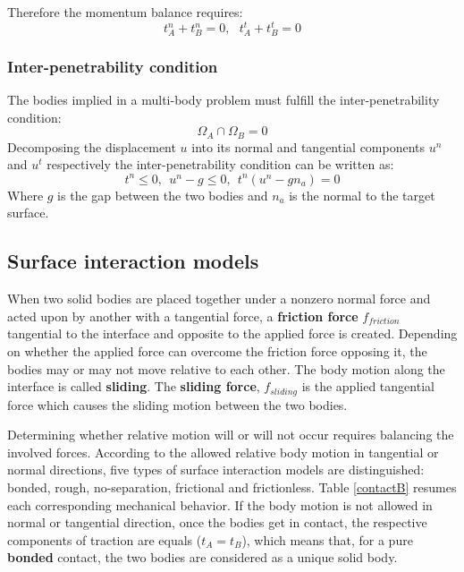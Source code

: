 Therefore the momentum balance requires:
\begin{equation} 
t_A^n + t_B^n = 0, \ \ \ t_A^t + t_B^t = 0
\end{equation} 

 \subsubsection*{Inter-penetrability condition}
The bodies implied in a multi-body problem must fulfill the inter-penetrability condition:
\begin{equation}
\Omega_A \cap \Omega_B = 0
\end{equation}
Decomposing the displacement $u$ into its normal and tangential components $u^n$ and $u^t$ respectively the inter-penetrability condition can be written as:
\begin{equation}
t^n \leq 0, \ \ u^n-g \leq 0, \ \ t^n(u^n-g n_a) = 0
\end{equation}
 Where $g$ is the gap between the two bodies and $n_a$ is the normal to the target surface.

\subsection{Surface interaction models}%

\label{subsection:surfaceinteractionmodels}
When two solid bodies are placed together under a nonzero normal force and acted upon by another with a tangential force, a \textbf{friction force} $f_{friction}$ tangential to the interface and opposite to the applied force is created. Depending on whether the applied force can overcome the friction force opposing it, the bodies may or may not move relative to each other. The body motion along the interface is called \textbf{sliding}. The \textbf{sliding force}, $f_{sliding}$ is the applied tangential force which causes the sliding motion between the two bodies.
  
Determining whether relative motion will or will not occur requires balancing the involved forces. According to the allowed relative body motion in tangential or normal directions, five types of surface interaction models are distinguished: bonded, rough, no-separation, frictional and frictionless. Table \ref{contactB} resumes each corresponding mechanical behavior. If the body motion is not allowed in normal or tangential direction, once the bodies get in contact, the respective components of traction are equals ($t_A=t_B$), which means that, for a pure \textbf{bonded} contact, the two bodies are considered as a unique solid body.    

